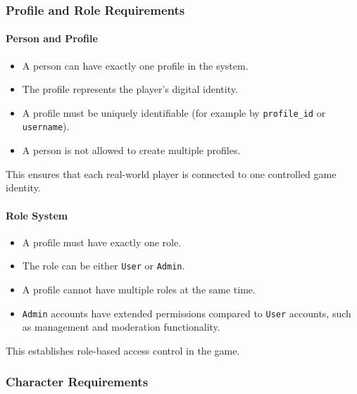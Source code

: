 \hypertarget{profile-and-role-requirements}{%
\subsubsection{Profile and Role
Requirements}\label{profile-and-role-requirements}}

\hypertarget{person-and-profile}{%
\paragraph{Person and Profile}\label{person-and-profile}}

\begin{itemize}
\tightlist
\item
  A person can have exactly one profile in the system.
\item
  The profile represents the player's digital identity.
\item
  A profile must be uniquely identifiable (for example by
  \texttt{profile\_id} or \texttt{username}).
\item
  A person is not allowed to create multiple profiles.
\end{itemize}

This ensures that each real-world player is connected to one controlled
game identity.

\hypertarget{role-system}{%
\paragraph{Role System}\label{role-system}}

\begin{itemize}
\tightlist
\item
  A profile must have exactly one role.
\item
  The role can be either \texttt{User} or \texttt{Admin}.
\item
  A profile cannot have multiple roles at the same time.
\item
  \texttt{Admin} accounts have extended permissions compared to
  \texttt{User} accounts, such as management and moderation
  functionality.
\end{itemize}

This establishes role-based access control in the game.

\hypertarget{character-requirements}{%
\subsubsection{Character Requirements}\label{character-requirements}}

